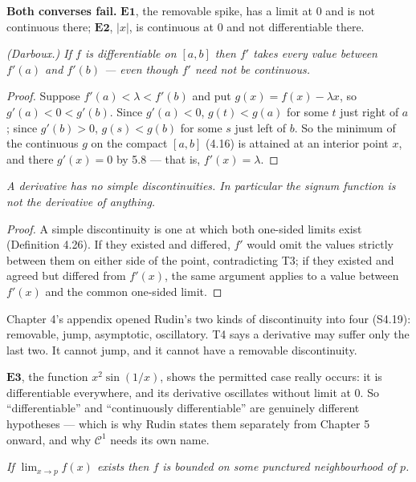 \noindent
\textbf{Both converses fail.} $\mathbf{E1}$, the removable spike, has a limit
at $0$ and is not continuous there; $\mathbf{E2}$, $|x|$, is continuous at
$0$ and not differentiable there.

\emph{(Darboux.) If $f$ is differentiable on $[a,b]$ then $f'$ takes every
value between $f'(a)$ and $f'(b)$ --- even though $f'$ need not be
continuous.}

\begin{proof}
Suppose $f'(a) < \lambda < f'(b)$ and put $g(x) = f(x) - \lambda x$, so
$g'(a) < 0 < g'(b)$. Since $g'(a)<0$, $g(t)<g(a)$ for some $t$ just right of
$a$; since $g'(b)>0$, $g(s)<g(b)$ for some $s$ just left of $b$. So the
minimum of the continuous $g$ on the compact $[a,b]$ (4.16) is attained at an
interior point $x$, and there $g'(x)=0$ by 5.8 --- that is, $f'(x)=\lambda$.
\end{proof}

\emph{A derivative has no simple discontinuities. In particular the signum
function is not the derivative of anything.}

\begin{proof}
A simple discontinuity is one at which both one-sided limits exist
(Definition 4.26). If they existed and differed, $f'$ would omit the values
strictly between them on either side of the point, contradicting T3; if they
existed and agreed but differed from $f'(x)$, the same argument applies to a
value between $f'(x)$ and the common one-sided limit.
\end{proof}

\begin{deeper}
Chapter 4's appendix opened Rudin's two kinds of discontinuity into four
(S4.19): removable, jump, asymptotic, oscillatory. T4 says a derivative may
suffer only the last two. It cannot jump, and it cannot have a removable
discontinuity.

$\mathbf{E3}$, the function $x^2\sin(1/x)$, shows the permitted case really
occurs: it is differentiable everywhere, and its derivative oscillates
without limit at $0$. So ``differentiable'' and ``continuously
differentiable'' are genuinely different hypotheses --- which is why Rudin
states them separately from Chapter 5 onward, and why $\mathscr{C}^1$ needs
its own name.
\end{deeper}

\emph{If $\lim_{x\to p}f(x)$ exists then $f$ is bounded on some punctured
neighbourhood of $p$.}

